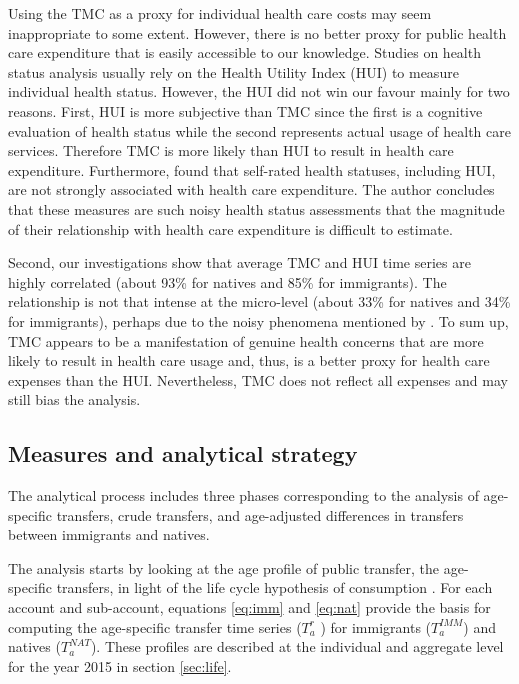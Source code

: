 \vspace{0.7em}\par
Using the TMC as a proxy for individual health care costs may seem inappropriate to some extent.
However, there is no better proxy for public health care expenditure that is easily accessible to our knowledge.
Studies on health status analysis usually rely on the Health Utility Index (HUI) to measure individual health status.
However, the HUI did not win our favour mainly for two reasons.
First, HUI is more subjective than TMC since the first is a cognitive evaluation of health status while the second represents actual usage of health care services.
Therefore TMC is more likely than HUI to result in health care expenditure. Furthermore, \citet{Pierard:2016ik} found that self-rated health statuses, including HUI, are not strongly associated with health care expenditure.
The author concludes that these measures are such noisy health status assessments that the magnitude of their relationship with health care expenditure is difficult to estimate.

\vspace{0.7em}\par
Second, our investigations show that average TMC and HUI time series are highly correlated (about 93\% for natives and 85\% for immigrants).
The relationship is not that intense at the micro-level (about 33\% for natives and 34\% for immigrants), perhaps due to the noisy phenomena mentioned by \citet{Pierard:2016ik}.
To sum up, TMC appears to be a manifestation of genuine health concerns that are more likely to result in health care usage and, thus, is a better proxy for health care expenses than the HUI. Nevertheless, TMC does not reflect all expenses and may still bias the analysis.

\subsection{Measures and analytical strategy}

The analytical process includes three phases corresponding to the analysis of age-specific transfers, crude transfers, and age-adjusted differences in transfers between immigrants and natives.

\vspace{0.7em}\par
The analysis starts by looking at the age profile of public transfer, the age-specific transfers, in light of the life cycle hypothesis of consumption \citep{Ando:1963ea,Deaton:2005vr}.
For each account and sub-account, equations \eqref{eq:imm} and \eqref{eq:nat} provide the basis for computing the age-specific transfer time series (\( T^{r}_a \) ) for immigrants (\(T^{IMM}_a\)) and natives (\( T^{NAT}_a \)).
These profiles are described at the individual and aggregate level for the year 2015 in section \autoref{sec:life}.

